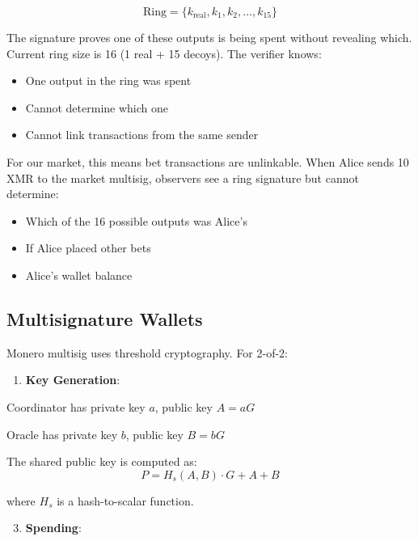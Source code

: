 \documentclass{article}
\begin{document}
$$\text{Ring} = \{k_{\text{real}}, k_1, k_2, \ldots, k_{15}\}$$

The signature proves one of these outputs is being spent without revealing which. Current ring size is 16 (1 real + 15 decoys). The verifier knows:

\begin{itemize}
\item One output in the ring was spent

\item Cannot determine which one

\item Cannot link transactions from the same sender

\end{itemize}

For our market, this means bet transactions are unlinkable. When Alice sends 10 XMR to the market multisig, observers see a ring signature but cannot determine:

\begin{itemize}
\item Which of the 16 possible outputs was Alice's

\item If Alice placed other bets

\item Alice's wallet balance

\end{itemize}

\subsection{Multisignature Wallets}

Monero multisig uses threshold cryptography. For 2-of-2:

\begin{enumerate}
\item \textbf{Key Generation}:

\end{enumerate}

Coordinator has private key $a$, public key $A = aG$

Oracle has private key $b$, public key $B = bG$

The shared public key is computed as:
$$P = H_s(A, B) \cdot G + A + B$$

where $H_s$ is a hash-to-scalar function.

\begin{enumerate}
\setcounter{enumi}{2}
\item \textbf{Spending}:

\end{enumerate}
\end{document}
